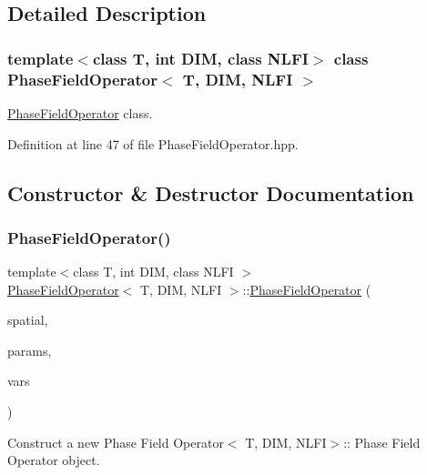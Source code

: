\subsection{Detailed Description}
\subsubsection*{template$<$class T, int D\+IM, class N\+L\+FI$>$\newline
class Phase\+Field\+Operator$<$ T, D\+I\+M, N\+L\+F\+I $>$}

\hyperlink{classPhaseFieldOperator}{Phase\+Field\+Operator} class. 

Definition at line 47 of file Phase\+Field\+Operator.\+hpp.



\subsection{Constructor \& Destructor Documentation}
\mbox{\label{classPhaseFieldOperator_ad71bd4990d4d0098766e37a135655c1f}} 
\subsubsection{\texorpdfstring{Phase\+Field\+Operator()}{PhaseFieldOperator()}\hspace{0.1cm}{\footnotesize\ttfamily [1/2]}}
{\footnotesize\ttfamily template$<$class T, int D\+IM, class N\+L\+FI $>$ \\
\hyperlink{classPhaseFieldOperator}{Phase\+Field\+Operator}$<$ T, D\+IM, N\+L\+FI $>$\+::\hyperlink{classPhaseFieldOperator}{Phase\+Field\+Operator} (\begin{DoxyParamCaption}\item[{\hyperlink{classSpatialDiscretization}{Spatial\+Discretization}$<$ T, D\+IM $>$ $\ast$}]{spatial,  }\item[{const \hyperlink{classParameters}{Parameters} \&}]{params,  }\item[{\hyperlink{classVariables}{Variables}$<$ T, D\+IM $>$ \&}]{vars }\end{DoxyParamCaption})}



Construct a new Phase Field Operator$<$ T,  D\+I\+M,  N\+L\+F\+I$>$\+:\+: Phase Field Operator object. 


